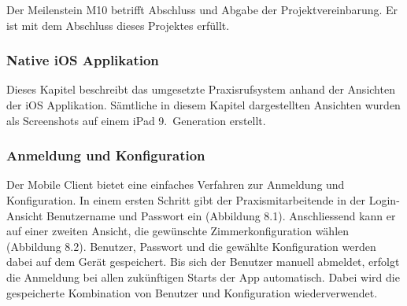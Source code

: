 Der Meilenstein M10 betrifft Abschluss und Abgabe der Projektvereinbarung.
Er ist mit dem Abschluss dieses Projektes erfüllt.

\subsubsection{Native iOS Applikation}

Dieses Kapitel beschreibt das umgesetzte Praxisrufsystem anhand der Ansichten der iOS Applikation.
Sämtliche in diesem Kapitel dargestellten Ansichten wurden als Screenshots auf einem iPad 9.\ Generation erstellt.

\subsubsection*{Anmeldung und Konfiguration}

Der Mobile Client bietet eine einfaches Verfahren zur Anmeldung und Konfiguration.
In einem ersten Schritt gibt der Praxismitarbeitende in der Login-Ansicht Benutzername und Passwort ein (Abbildung 8.1).
Anschliessend kann er auf einer zweiten Ansicht, die gewünschte Zimmerkonfiguration wählen (Abbildung 8.2).
Benutzer, Passwort und die gewählte Konfiguration werden dabei auf dem Gerät gespeichert.
Bis sich der Benutzer manuell abmeldet, erfolgt die Anmeldung bei allen zukünftigen Starts der App automatisch.
Dabei wird die gespeicherte Kombination von Benutzer und Konfiguration wiederverwendet.

